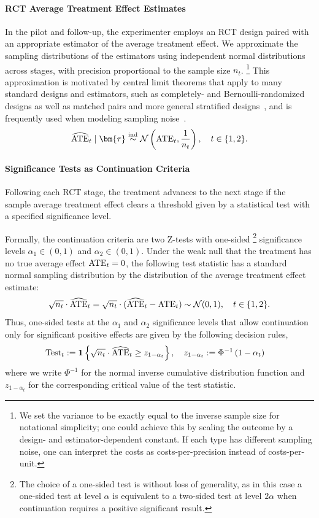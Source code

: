 \paragraph{RCT Average Treatment Effect Estimates}
In the pilot and follow-up, the experimenter employs an RCT design paired with an appropriate estimator of the average treatment effect.
We approximate the sampling distributions of the estimators using independent normal distributions across stages, with precision proportional to the sample size $n_t$.%
\footnote{
  We set the variance to be exactly equal to the inverse sample size for notational simplicity; one could achieve this by scaling the outcome by a design- and estimator-dependent constant.
  If each type has different sampling noise, one can interpret the costs as costs-per-precision instead of costs-per-unit.
}
This approximation is motivated by central limit theorems that apply to many standard designs and estimators, such as completely- and Bernoulli-randomized designs as well as matched pairs and more general stratified designs~\cite{LiDi17,Ding23}, and is frequently used when modeling sampling noise~\cite{FrazierPo09,ChickGa22,AzevedoDe20}.
\[
  \widehat{\ATE}_t \mid \bm{\tau} \overset{\text{ind}}{\sim}
  \mathcal{N}\left(
    \ATE_t,
    \frac{1}{n_t}
  \right),
  \quad t\in\{1,2\}.
\]

\paragraph{Significance Tests as Continuation Criteria}
Following each RCT stage, the treatment advances to the next stage if the sample average treatment effect clears a threshold given by a statistical test with a specified significance level.

Formally, the continuation criteria are two Z-tests with one-sided%
\footnote{
  The choice of a one-sided test is without loss of generality, as in this case
  a one-sided test at level $\alpha$ is equivalent to a two-sided test at level
  $2\alpha$ when continuation requires a positive significant result.
}
significance levels $\alpha_{1}\in(0,1)$ and $\alpha_{2}\in(0,1)$.
Under the weak null that the treatment has no true average effect $\mathrm{ATE}_t=0$, the following test statistic has a standard normal sampling distribution by the distribution of the average treatment effect estimate:
\[
  \sqrt{n_t}\cdot\widehat{\mathrm{ATE}}_t
  =
  \sqrt{n_t}\cdot(\widehat{\mathrm{ATE}}_t - \mathrm{ATE}_t)
  \sim
  \mathcal{N}(0,1),
  \quad t\in\{1,2\}.
\]
Thus, one-sided tests at the $\alpha_{1}$ and $\alpha_{2}$ significance levels that allow continuation only for significant positive effects are given by the following decision rules,
\begin{align*}
  \operatorname{Test}_t &
  :=
  \mathbf{1}\left\{
    \sqrt{n_t}\cdot\widehat{\mathrm{ATE}}_t\ge
    z_{1-\alpha_t}
  \right\} ,\quad z_{1-\alpha_t}:=\Phi^{-1}\left(1-\alpha_{t}\right)
\end{align*}
where we write $\Phi^{-1}$ for the normal inverse cumulative distribution function and $z_{1-\alpha_t}$ for the corresponding critical value of the test statistic.

